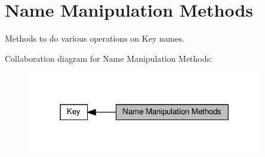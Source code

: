 \hypertarget{group__keyname}{}\section{Name Manipulation Methods}
\label{group__keyname}


Methods to do various operations on Key names.  


Collaboration diagram for Name Manipulation Methods\+:
\nopagebreak
\begin{figure}[H]
\begin{center}
\leavevmode
\includegraphics[width=291pt]{group__keyname}
\end{center}
\end{figure}
